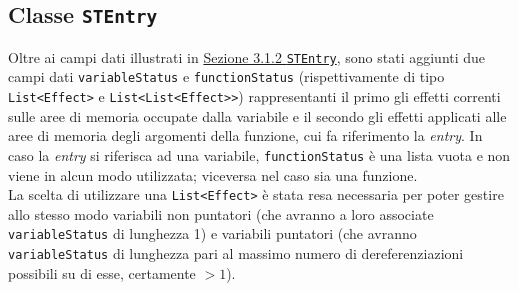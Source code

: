 \documentclass[../report.tex]{subfiles}
\begin{document}
\subsection[Classe STEntry]{Classe \texttt{STEntry}}\label{ss:stentry-effetti}
Oltre ai campi dati illustrati in \hyperref[ss:stentry]{Sezione 3.1.2 \texttt{STEntry}}, sono stati aggiunti due campi dati \verb|variableStatus| e \verb|functionStatus| (rispettivamente di tipo \verb|List<Effect>| e \verb|List<List<Effect>>|) rappresentanti il primo gli effetti correnti sulle aree di memoria occupate dalla variabile e il secondo gli effetti applicati alle aree di memoria degli argomenti della funzione, cui fa riferimento la \textit{entry}.
In caso la \textit{entry} si riferisca ad una variabile, \verb|functionStatus| è una lista vuota e non viene in alcun modo utilizzata; viceversa nel caso sia una funzione.\\
La scelta di utilizzare una \verb|List<Effect>| è stata resa necessaria per poter gestire allo stesso modo variabili non puntatori (che avranno a loro associate \verb|variableStatus| di lunghezza 1) e variabili puntatori (che avranno \verb|variableStatus| di lunghezza pari al massimo numero di dereferenziazioni possibili su di esse, certamente $> 1$).
\end{document}
